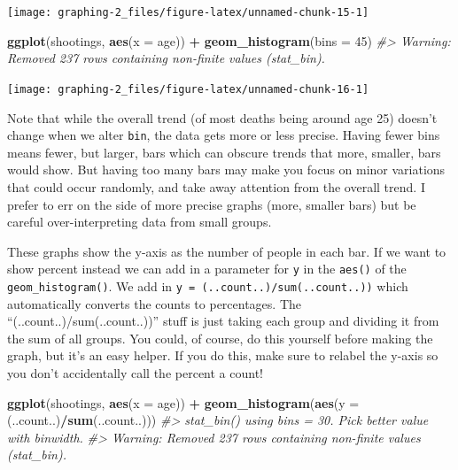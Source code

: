 \documentclass[
  12pt,
]{book}
\newenvironment{Shaded}{\begin{snugshade}}{\end{snugshade}}
\newcommand{\CommentTok}[1]{\textcolor[rgb]{0.56,0.35,0.01}{\textit{#1}}}
\newcommand{\DataTypeTok}[1]{\textcolor[rgb]{0.13,0.29,0.53}{#1}}
\newcommand{\DecValTok}[1]{\textcolor[rgb]{0.00,0.00,0.81}{#1}}
\newcommand{\KeywordTok}[1]{\textcolor[rgb]{0.13,0.29,0.53}{\textbf{#1}}}
\newcommand{\NormalTok}[1]{#1}
\newcommand{\OperatorTok}[1]{\textcolor[rgb]{0.81,0.36,0.00}{\textbf{#1}}}
\newcommand{\StringTok}[1]{\textcolor[rgb]{0.31,0.60,0.02}{#1}}
\begin{document}
\begin{center}\texttt{[image: graphing-2\_files/figure-latex/unnamed-chunk-15-1]} \end{center}

\begin{Shaded}
\begin{Highlighting}[]
\KeywordTok{ggplot}\NormalTok{(shootings, }\KeywordTok{aes}\NormalTok{(}\DataTypeTok{x =}\NormalTok{ age)) }\OperatorTok{+}\StringTok{ }
\StringTok{  }\KeywordTok{geom\_histogram}\NormalTok{(}\DataTypeTok{bins =} \DecValTok{45}\NormalTok{)}
\CommentTok{\#> Warning: Removed 237 rows containing non{-}finite values (stat\_bin).}
\end{Highlighting}
\end{Shaded}

\begin{center}\texttt{[image: graphing-2\_files/figure-latex/unnamed-chunk-16-1]} \end{center}

Note that while the overall trend (of most deaths being around age 25) doesn't change when we alter \texttt{bin}, the data gets more or less precise. Having fewer bins means fewer, but larger, bars which can obscure trends that more, smaller, bars would show. But having too many bars may make you focus on minor variations that could occur randomly, and take away attention from the overall trend. I prefer to err on the side of more precise graphs (more, smaller bars) but be careful over-interpreting data from small groups.

These graphs show the y-axis as the number of people in each bar. If we want to show percent instead we can add in a parameter for \texttt{y} in the \texttt{aes()} of the \texttt{geom\_histogram()}. We add in \texttt{y\ =\ (..count..)/sum(..count..))} which automatically converts the counts to percentages. The ``(..count..)/sum(..count..))'' stuff is just taking each group and dividing it from the sum of all groups. You could, of course, do this yourself before making the graph, but it's an easy helper. If you do this, make sure to relabel the y-axis so you don't accidentally call the percent a count!

\begin{Shaded}
\begin{Highlighting}[]
\KeywordTok{ggplot}\NormalTok{(shootings, }\KeywordTok{aes}\NormalTok{(}\DataTypeTok{x =}\NormalTok{ age)) }\OperatorTok{+}\StringTok{ }
\StringTok{  }\KeywordTok{geom\_histogram}\NormalTok{(}\KeywordTok{aes}\NormalTok{(}\DataTypeTok{y =}\NormalTok{ (..count..)}\OperatorTok{/}\KeywordTok{sum}\NormalTok{(..count..)))}
\CommentTok{\#> \textasciigrave{}stat\_bin()\textasciigrave{} using \textasciigrave{}bins = 30\textasciigrave{}. Pick better value with \textasciigrave{}binwidth\textasciigrave{}.}
\CommentTok{\#> Warning: Removed 237 rows containing non{-}finite values (stat\_bin).}
\end{Highlighting}
\end{Shaded}
\end{document}
